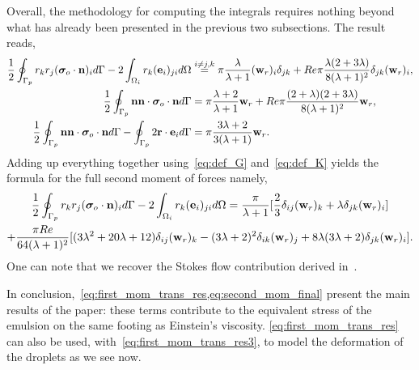 Overall, the methodology for computing the integrals requires nothing beyond what has already been presented in the previous two subsections. 
The result reads, 
\begin{align}
    \frac{1}{2}\intS[p]{r_kr_j ( \bm\sigma_{o}\cdot \textbf{n})_i}
    - 2\intO[i]{r_k (\textbf{e}_i)_{ji}}
    &\overset{i\neq j,k}{=}
    \pi \frac{\lambda}{\lambda+1}(\textbf{w}_r)_i \delta_{jk} 
    + Re  \pi \frac{\lambda (2+3\lambda)}{8(\lambda+1)^2} \delta_{jk} (\textbf{w}_r)_i,\\
    \frac{1}{2}\intS[p]{\textbf{nn} \cdot  \bm\sigma_{o}\cdot \textbf{n}}
    &=
    \pi\frac{\lambda+2}{\lambda+1}\textbf{w}_r
    + Re \pi \frac{(2+\lambda)(2+3\lambda)}{8(\lambda+1)^2}\textbf{w}_r,   \\
    \frac{1}{2}\intS[p]{\textbf{nn} \cdot  \bm\sigma_{o}\cdot \textbf{n}}
    - \intS[p]{2 \textbf{r}\cdot \textbf{e}_i}
    &=
    \pi \frac{3\lambda +2}{3(\lambda+1)} \textbf{w}_{r}. 
    \label{eq:second_moment_Trik}
\end{align}
Adding up everything together using~\ref{eq:def_G} and~\ref{eq:def_K} yields the formula for the full second moment of forces namely,  
\begin{multline}
    \frac{1}{2}\intS[p]{r_kr_j ( \bm\sigma_{o}\cdot \textbf{n})_i}
    - 2\intO[i]{r_k (\textbf{e}_i)_{ji}}
    =
    \frac{\pi }{\lambda+1} [
        \frac{2}{3}\delta_{ij} (\textbf{w}_r)_k 
        + \lambda \delta_{jk} (\textbf{w}_r)_i
    ]\\ 
    +
    \frac{\pi Re}{64(\lambda+1)^2} [
        (3\lambda^2+20\lambda +12) \delta_{ij} (\textbf{w}_r)_k 
        -( 3\lambda+2)^2 \delta_{ik} (\textbf{w}_r)_j 
        + 8 \lambda (3\lambda+2)\delta_{jk} (\textbf{w}_r)_i
    ]. 
    \label{eq:second_mom_final}
\end{multline}
One can note that we recover the Stokes flow contribution derived in~\cite{zhang1997momentum,fintzi2025averaged}. 



In conclusion,~\ref{eq:first_mom_trans_res,eq:second_mom_final} present the main results of the paper: these terms contribute to the equivalent stress of the emulsion on the same footing as Einstein’s viscosity. 
\ref{eq:first_mom_trans_res} can also be used, with~\ref{eq:first_mom_trans_res3}, to model the deformation of the droplets as we see now. 